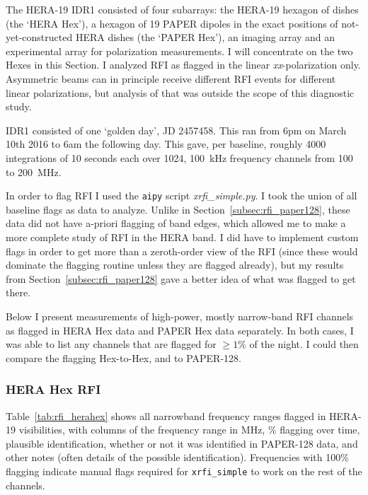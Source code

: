 The HERA-19 IDR1 consisted of four subarrays: the HERA-19 hexagon of dishes (the `HERA Hex'), a hexagon of 19 PAPER dipoles in the exact positions of not-yet-constructed HERA dishes (the `PAPER Hex'), an imaging array and an experimental array for polarization measurements. I will concentrate on the two Hexes in this Section. I analyzed RFI as flagged in the linear \textit{xx}-polarization only. Asymmetric beams can in principle receive different RFI events for different linear polarizations, but analysis of that was outside the scope of this diagnostic study.

IDR1 consisted of one `golden day', JD 2457458. This ran from 6pm on March 10th 2016 to 6am the following day. This gave, per baseline, roughly 4000 integrations of 10 seconds each over 1024, 100~kHz frequency channels from 100 to 200~MHz.

In order to flag RFI I used the {\tt aipy} script \textit{xrfi\_simple.py}. I took the union of all baseline flags as data to analyze. Unlike in Section~\ref{subsec:rfi_paper128}, these data did not have a-priori flagging of band edges, which allowed me to make a more complete study of RFI in the HERA band. I did have to implement custom flags in order to get more than a zeroth-order view of the RFI (since these would dominate the flagging routine unless they are flagged already), but my results from Section~\ref{subsec:rfi_paper128}  gave a better idea of what was flagged to get there. 

Below I present measurements of high-power, mostly narrow-band RFI channels as flagged in HERA Hex data and PAPER Hex data separately. In both cases, I was able to list any channels that are flagged for $\geqslant 1\%$ of the night. I could then compare the flagging Hex-to-Hex, and to PAPER-128.

\subsubsection{HERA Hex RFI}
\label{subsubsec:rfi_herahex}

Table~\ref{tab:rfi_herahex} shows all narrowband frequency ranges flagged in HERA-19 visibilities, with columns of the frequency range in MHz, \% flagging over time, plausible identification, whether or not it was identified in PAPER-128 data, and other notes (often details of the possible identification). Frequencies with 100\% flagging indicate manual flags required for {\tt xrfi\_simple} to work on the rest of the channels. 

